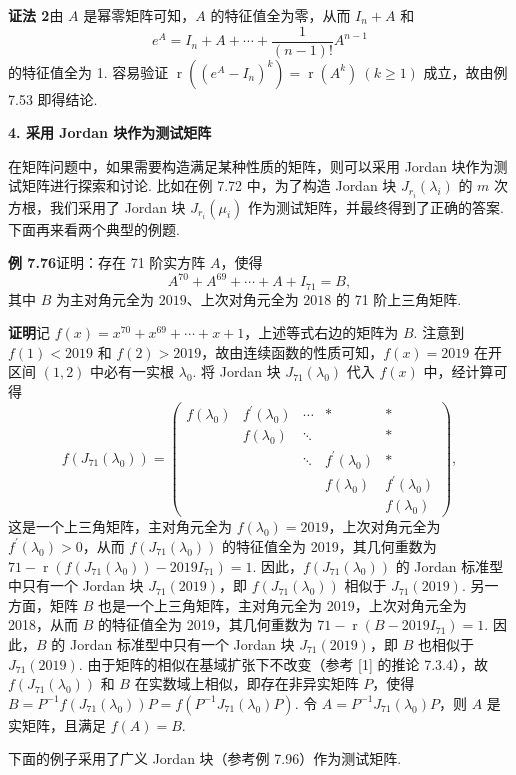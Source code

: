 \documentclass[UTF8, 12pt, fontset=fandol, oneside]{ctexart}
\begin{document}
\noindent\textbf{证法 2}\quad 由 $A$ 是幂零矩阵可知，$A$ 的特征值全为零，从而 $I_n+A$ 和
\[
e^A=I_n+A+\cdots+\frac1{(n-1)!}A^{n-1}
\]
的特征值全为 1. 容易验证 $\operatorname{r}((e^A-I_n)^k)=\operatorname{r}(A^k)\ (k\ge1)$ 成立，故由例 7.53 即得结论.

\noindent\textbf{4. 采用 Jordan 块作为测试矩阵}

在矩阵问题中，如果需要构造满足某种性质的矩阵，则可以采用 Jordan 块作为测试矩阵进行探索和讨论. 比如在例 7.72 中，为了构造 Jordan 块 $J_{r_i}(\lambda_i)$ 的 $m$ 次方根，我们采用了 Jordan 块 $J_{r_i}(\mu_i)$ 作为测试矩阵，并最终得到了正确的答案. 下面再来看两个典型的例题.

\noindent\textbf{例 7.76}\quad 证明：存在 71 阶实方阵 $A$，使得
\[
A^{70}+A^{69}+\cdots+A+I_{71}=B,
\]
其中 $B$ 为主对角元全为 $2019$、上次对角元全为 $2018$ 的 71 阶上三角矩阵.

\noindent\textbf{证明}\quad 记 $f(x)=x^{70}+x^{69}+\cdots+x+1$，上述等式右边的矩阵为 $B$. 注意到 $f(1)<2019$ 和 $f(2)>2019$，故由连续函数的性质可知，$f(x)=2019$ 在开区间 $(1,2)$ 中必有一实根 $\lambda_0$. 将 Jordan 块 $J_{71}(\lambda_0)$ 代入 $f(x)$ 中，经计算可得
\[
f(J_{71}(\lambda_0))=\left(\begin{array}{ccccc}
f(\lambda_0)&f^{\prime}(\lambda_0)&\cdots&*&*\\
&f(\lambda_0)&\ddots&&*\\
&&\ddots&f^{\prime}(\lambda_0)&*\\
&&&f(\lambda_0)&f^{\prime}(\lambda_0)\\
&&&&f(\lambda_0)
\end{array}\right),
\]
这是一个上三角矩阵，主对角元全为 $f(\lambda_0)=2019$，上次对角元全为 $f^{\prime}(\lambda_0)>0$，从而 $f(J_{71}(\lambda_0))$ 的特征值全为 2019，其几何重数为 $71-\operatorname{r}(f(J_{71}(\lambda_0))-2019I_{71})=1$. 因此，$f(J_{71}(\lambda_0))$ 的 Jordan 标准型中只有一个 Jordan 块 $J_{71}(2019)$，即 $f(J_{71}(\lambda_0))$ 相似于 $J_{71}(2019)$. 另一方面，矩阵 $B$ 也是一个上三角矩阵，主对角元全为 2019，上次对角元全为 2018，从而 $B$ 的特征值全为 2019，其几何重数为 $71-\operatorname{r}(B-2019I_{71})=1$. 因此，$B$ 的 Jordan 标准型中只有一个 Jordan 块 $J_{71}(2019)$，即 $B$ 也相似于 $J_{71}(2019)$. 由于矩阵的相似在基域扩张下不改变（参考 [1] 的推论 7.3.4），故 $f(J_{71}(\lambda_0))$ 和 $B$ 在实数域上相似，即存在非异实矩阵 $P$，使得 $B=P^{-1}f(J_{71}(\lambda_0))P=f(P^{-1}J_{71}(\lambda_0)P)$. 令 $A=P^{-1}J_{71}(\lambda_0)P$，则 $A$ 是实矩阵，且满足 $f(A)=B$.

下面的例子采用了广义 Jordan 块（参考例 7.96）作为测试矩阵.
\end{document}
